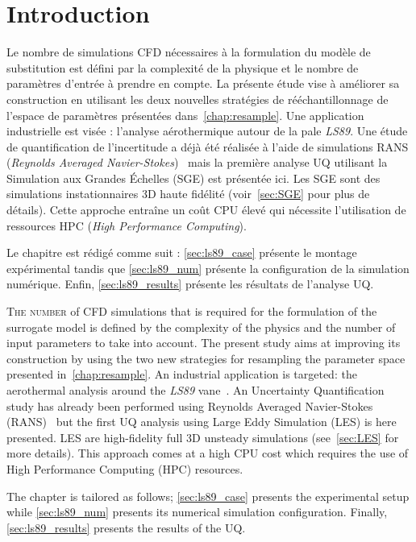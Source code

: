 \section{Introduction}

\begin{chapquote}
Le nombre de simulations CFD nécessaires à la formulation du modèle de substitution est défini par la complexité de la physique et le nombre de paramètres d'entrée à prendre en compte. La présente étude vise à améliorer sa construction en utilisant les deux nouvelles stratégies de rééchantillonnage de l'espace de paramètres présentées dans~\cref{chap:resample}. Une application industrielle est visée : l'analyse aérothermique autour de la pale \textit{LS89}. Une étude de quantification de l'incertitude a déjà été réalisée à l'aide de simulations RANS (\emph{Reynolds Averaged Navier-Stokes})~\cite{Gourdain2010,emory2016} mais la première analyse UQ utilisant la Simulation aux Grandes Échelles (SGE) est présentée ici. Les SGE sont des simulations instationnaires 3D haute fidélité (voir~\cref{sec:SGE} pour plus de détails). Cette approche entraîne un coût CPU élevé qui nécessite l'utilisation de ressources HPC (\emph{High Performance Computing}).

Le chapitre est rédigé comme suit : \cref{sec:ls89_case} présente le montage expérimental tandis que \cref{sec:ls89_num} présente la configuration de la simulation numérique. Enfin, \cref{sec:ls89_results} présente les résultats de l'analyse UQ.
\end{chapquote}

\lettrine{T}{he number} of CFD simulations that is required for the formulation of the surrogate model is defined by the complexity of the physics and the number of input parameters to take into account. The present study aims at improving its construction by using the two new strategies for resampling the parameter space presented in~\cref{chap:resample}. An industrial application is targeted: the aerothermal analysis around the \textit{LS89} vane~\cite{arts1990}. An Uncertainty Quantification study has already been performed using Reynolds Averaged Navier-Stokes (RANS)~\cite{Gourdain2010,emory2016} but the first UQ analysis using Large Eddy Simulation (LES) is here presented. LES are high-fidelity full 3D unsteady simulations (see~\cref{sec:LES} for more details). This approach comes at a high CPU cost which requires the use of High Performance Computing (HPC) resources.

The chapter is tailored as follows; \cref{sec:ls89_case} presents the experimental setup while \cref{sec:ls89_num} presents its numerical simulation configuration. Finally, \cref{sec:ls89_results}  presents the results of the UQ.

